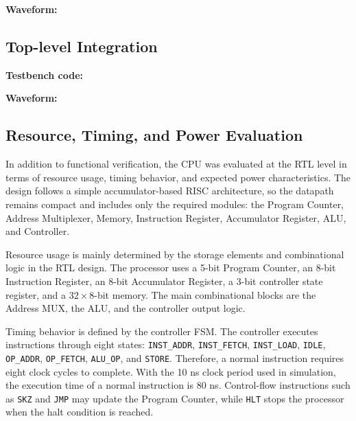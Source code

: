 \textbf{Waveform:}

\subsection{Top-level Integration}
\textbf{Testbench code:}

\textbf{Waveform:}


\subsection{Resource, Timing, and Power Evaluation}

In addition to functional verification, the CPU was evaluated at the RTL level in terms of resource usage, timing behavior, and expected power characteristics. The design follows a simple accumulator-based RISC architecture, so the datapath remains compact and includes only the required modules: the Program Counter, Address Multiplexer, Memory, Instruction Register, Accumulator Register, ALU, and Controller.

Resource usage is mainly determined by the storage elements and combinational logic in the RTL design. The processor uses a 5-bit Program Counter, an 8-bit Instruction Register, an 8-bit Accumulator Register, a 3-bit controller state register, and a \(32 \times 8\)-bit memory. The main combinational blocks are the Address MUX, the ALU, and the controller output logic.

Timing behavior is defined by the controller FSM. The controller executes instructions through eight states: \texttt{INST\_ADDR}, \texttt{INST\_FETCH}, \texttt{INST\_LOAD}, \texttt{IDLE}, \texttt{OP\_ADDR}, \texttt{OP\_FETCH}, \texttt{ALU\_OP}, and \texttt{STORE}. Therefore, a normal instruction requires eight clock cycles to complete. With the 10 ns clock period used in simulation, the execution time of a normal instruction is 80 ns. Control-flow instructions such as \texttt{SKZ} and \texttt{JMP} may update the Program Counter, while \texttt{HLT} stops the processor when the halt condition is reached.

